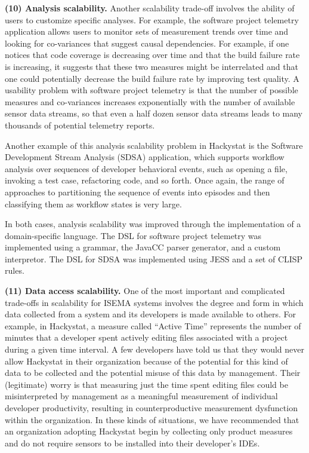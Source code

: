 \documentclass[10pt,twocolumn]{article}
\begin{document}
{\bf (10) Analysis scalability.} Another scalability trade-off involves the
ability of users to customize specific analyses.  For example, the software
project telemetry application allows users to monitor sets of
measurement trends over time and looking for co-variances that suggest
causal dependencies.  For example, if one notices that code coverage is
decreasing over time and that the build failure rate is increasing, it
suggests that these two measures might be interrelated and that one could
potentially decrease the build failure rate by improving test quality.  A
usability problem with software project telemetry is that the number of
possible measures and co-variances increases exponentially with the number
of available sensor data streams, so that even a half dozen sensor data
streams leads to many thousands of potential telemetry reports.

Another example of this analysis scalability problem in Hackystat is the
Software Development Stream Analysis (SDSA) application, which supports
workflow analysis over sequences of developer behavioral events, such as
opening a file, invoking a test case, refactoring code, and so forth. 
Once again, the range of approaches to partitioning the sequence of events into
episodes and then classifying them as workflow states is very large.  

In both cases, analysis scalability was improved through the implementation
of a domain-specific language.  The DSL for software project telemetry was
implemented using a grammar, the JavaCC parser generator, and a custom
interpretor.  The DSL for SDSA was implemented using JESS and a set of
CLISP rules. 

{\bf (11) Data access scalability.}  One of the most important and
complicated trade-offs in scalability for ISEMA systems involves the degree
and form in which data collected from a system and its developers is made
available to others.  For example, in Hackystat, a measure called ``Active
Time'' represents the number of minutes that a developer spent actively
editing files associated with a project during a given time interval.  A
few developers have told us that they would never allow Hackystat in their
organization because of the potential for this kind of data to be collected
and the potential misuse of this data by management. Their (legitimate)
worry is that measuring just the time spent editing files could be
misinterpreted by management as a meaningful measurement of individual
developer productivity, resulting in counterproductive measurement
dysfunction within the organization.  In these kinds of situations, we have
recommended that an organization adopting Hackystat begin by collecting
only product measures and do not require sensors to be installed into their
developer's IDEs.
\end{document}
